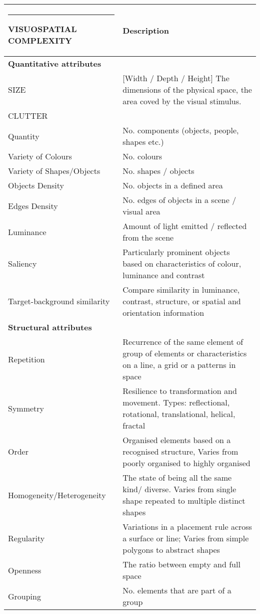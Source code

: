 \documentclass[a4paper]{article}
\makeatletter
\def\hlinewd#1{%
  \noalign{\ifnum0=`}\fi\hrule \@height #1 \futurelet
   \reserved@a\@xhline}
\makeatother
\begin{document}
{
\begin{table}[t]
\renewcommand{\arraystretch}{1.1}
\begin{center}
 \scriptsize\sffamily
\begin{tabular}{>{\columncolor[gray]{0.92}}l p{12.5cm}}
\hlinewd{1pt}
\rowcolor[gray]{.92}\textbf{VISUOSPATIAL COMPLEXITY} & \textbf{Description} \\\hline\hline

\textbf{Quantitative attributes} &  \\
\hline

 SIZE & [Width / Depth / Height]  The dimensions of the physical space, the area coved by the visual stimulus.  \\[6pt]
 
  CLUTTER   &  \\
 Quantity   &  No. components  (objects, people, shapes etc.) \\
 Variety of Colours & No. colours \\
 Variety of Shapes/Objects & No.  shapes / objects   \\ 
 Objects Density &  No. objects in a defined area \\
 Edges Density &  No. edges of objects in a scene / visual area  \\
 Luminance &  Amount of light emitted / reflected from the scene \\
Saliency &  Particularly prominent objects based on characteristics of colour, luminance and contrast   \\ 
Target-background similarity & Compare similarity in luminance, contrast, structure, or spatial and orientation information \\


\hline
\textbf{Structural  attributes}     &  \\
\hline

Repetition & Recurrence of the same element of group of elements or characteristics on a line, a grid  or a patterns in space \\
Symmetry & Resilience to transformation and movement. Types: reflectional, rotational, translational, helical, fractal   \\ 
Order & Organised elements based on a recognised structure, Varies from poorly organised to highly organised \\
Homogeneity/Heterogeneity  & The state of being all the same kind/ diverse. Varies from single shape repeated to multiple distinct shapes  \\  
Regularity  & Variations in a placement rule across a surface or line; Varies from simple polygons to abstract shapes  \\
Openness & The ratio between empty and full space  \\ 
Grouping & No. elements that are part of a group  \\



\end{tabular}
\end{center}
\end{table}}
\end{document}
